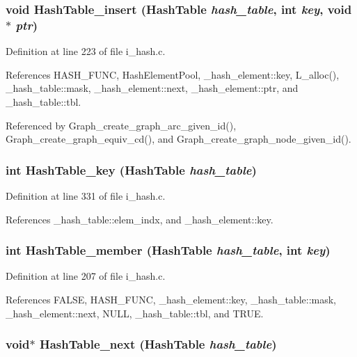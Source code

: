 \subsubsection{\setlength{\rightskip}{0pt plus 5cm}void Hash\-Table\_\-insert (\bf{Hash\-Table} {\em hash\_\-table}, int {\em key}, void $\ast$ {\em ptr})}\label{i__hash_8c_c25cfe5a8697fe45eb5dd0644d604b0c}




Definition at line 223 of file i\_\-hash.c.

References HASH\_\-FUNC, Hash\-Element\-Pool, \_\-hash\_\-element::key, L\_\-alloc(), \_\-hash\_\-table::mask, \_\-hash\_\-element::next, \_\-hash\_\-element::ptr, and \_\-hash\_\-table::tbl.

Referenced by Graph\_\-create\_\-graph\_\-arc\_\-given\_\-id(), Graph\_\-create\_\-graph\_\-equiv\_\-cd(), and Graph\_\-create\_\-graph\_\-node\_\-given\_\-id().
\subsubsection{\setlength{\rightskip}{0pt plus 5cm}int Hash\-Table\_\-key (\bf{Hash\-Table} {\em hash\_\-table})}\label{i__hash_8c_9c43b8611c01aad5912e93506fc8679b}




Definition at line 331 of file i\_\-hash.c.

References \_\-hash\_\-table::elem\_\-indx, and \_\-hash\_\-element::key.
\subsubsection{\setlength{\rightskip}{0pt plus 5cm}int Hash\-Table\_\-member (\bf{Hash\-Table} {\em hash\_\-table}, int {\em key})}\label{i__hash_8c_8f1e3168c1a6e919af2fa763326df894}




Definition at line 207 of file i\_\-hash.c.

References FALSE, HASH\_\-FUNC, \_\-hash\_\-element::key, \_\-hash\_\-table::mask, \_\-hash\_\-element::next, NULL, \_\-hash\_\-table::tbl, and TRUE.
\subsubsection{\setlength{\rightskip}{0pt plus 5cm}void$\ast$ Hash\-Table\_\-next (\bf{Hash\-Table} {\em hash\_\-table})}\label{i__hash_8c_e11b578b4892e91f3062ef6927ddd638}




